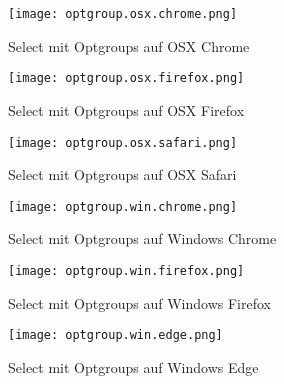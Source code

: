 \begin{figure}[!htb]
    \centering
    \begin{minipage}[b]{0.28\textwidth}
        \centering
        \texttt{[image: optgroup.osx.chrome.png]}
        \caption{Select mit Optgroups auf OSX Chrome}
        \label{img:optgroupOsxChromeSelect}
    \end{minipage}
    \hfill
    \begin{minipage}[b]{0.28\textwidth}
        \centering
        \texttt{[image: optgroup.osx.firefox.png]}
        \caption{Select mit Optgroups auf OSX Firefox}
        \label{img:optgroupOsxFirefoxSelect}
    \end{minipage}
    \hfill
    \begin{minipage}[b]{0.28\textwidth}
        \centering
        \texttt{[image: optgroup.osx.safari.png]}
        \caption{Select mit Optgroups auf OSX Safari}
        \label{img:optgroupOsxSafariSelect}
    \end{minipage}
\end{figure}

\begin{figure}[!htb]
    \centering
    \begin{minipage}[b]{0.28\textwidth}
        \centering
        \texttt{[image: optgroup.win.chrome.png]}
        \caption{Select mit Optgroups auf Windows Chrome}
        \label{img:optgroupWinChromeSelect}
    \end{minipage}
    \hfill
    \begin{minipage}[b]{0.28\textwidth}
        \centering
        \texttt{[image: optgroup.win.firefox.png]}
        \caption{Select mit Optgroups auf Windows Firefox}
        \label{img:optgroupWinFirefoxSelect}
    \end{minipage}
    \hfill
    \begin{minipage}[b]{0.28\textwidth}
        \centering
        \texttt{[image: optgroup.win.edge.png]}
        \caption{Select mit Optgroups auf Windows Edge}
        \label{img:optgroupWinEdgeSelect}
    \end{minipage}
\end{figure}
